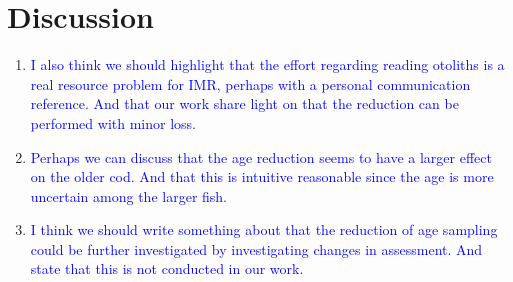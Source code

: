 \documentclass[a4paper 12pt]{article}
\numberwithin{equation}{section}
\newcommand{\nat}[1]{\textcolor{blue}{#1}}
\begin{document}
\clearpage
\section{Discussion}
\label{sec:discussion}

\begin{enumerate}
\item \nat{I also think we should highlight that the effort regarding reading otoliths is a real resource problem for IMR, perhaps with a personal communication reference.  And that our work share light on that the reduction can be performed with minor loss.}

\item \nat{Perhaps we can discuss that the age reduction seems to have a larger effect on the older cod. And that this is intuitive reasonable since the age is more uncertain among the larger fish.}

\item \nat{I think we should write something about that the reduction of age sampling could be further investigated by investigating changes in assessment. And state that this is not conducted in our work.} 
\end{enumerate}
\end{document}
